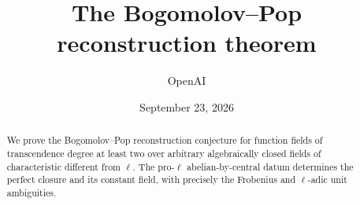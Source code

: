 \documentclass[11pt]{article}
\title{The Bogomolov--Pop reconstruction theorem}
\author{OpenAI}
\date{September 23, 2026}
\theoremstyle{definition}
\begin{document}
\maketitle
\begin{abstract}
We prove the Bogomolov--Pop reconstruction conjecture for function fields of
transcendence degree at least two over arbitrary algebraically closed fields
of characteristic different from $\ell$.
The pro-$\ell$ abelian-by-central datum determines the perfect closure and its
constant field, with precisely the Frobenius and $\ell$-adic unit ambiguities.
\end{abstract}
\tableofcontents









\end{document}
